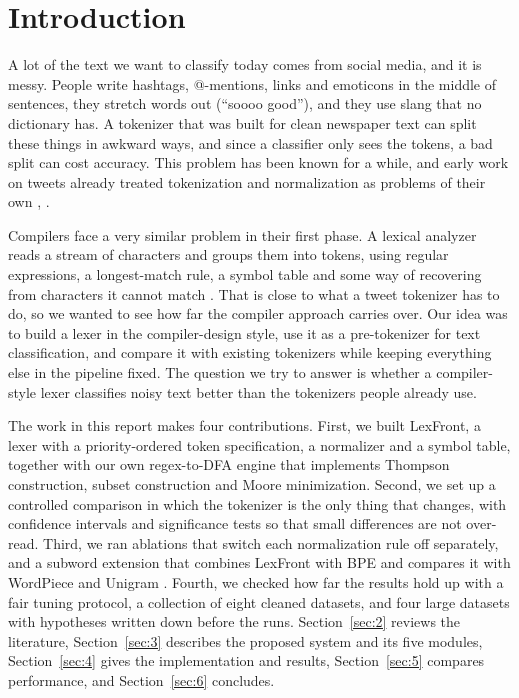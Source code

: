 \documentclass[journal,onecolumn,12pt,a4paper]{IEEEtran}
\begin{document}
\section{Introduction}\label{sec:1}
A lot of the text we want to classify today comes from social media, and it is messy. People write hashtags, @-mentions, links and emoticons in the middle of sentences, they stretch words out (``soooo good''), and they use slang that no dictionary has. A tokenizer that was built for clean newspaper text can split these things in awkward ways, and since a classifier only sees the tokens, a bad split can cost accuracy. This problem has been known for a while, and early work on tweets already treated tokenization and normalization as problems of their own \cite{r2}, \cite{r3}.

Compilers face a very similar problem in their first phase. A lexical analyzer reads a stream of characters and groups them into tokens, using regular expressions, a longest-match rule, a symbol table and some way of recovering from characters it cannot match \cite{r1}. That is close to what a tweet tokenizer has to do, so we wanted to see how far the compiler approach carries over. Our idea was to build a lexer in the compiler-design style, use it as a pre-tokenizer for text classification, and compare it with existing tokenizers while keeping everything else in the pipeline fixed. The question we try to answer is whether a compiler-style lexer classifies noisy text better than the tokenizers people already use.

The work in this report makes four contributions. First, we built LexFront, a lexer with a priority-ordered token specification, a normalizer and a symbol table, together with our own regex-to-DFA engine that implements Thompson construction, subset construction and Moore minimization. Second, we set up a controlled comparison in which the tokenizer is the only thing that changes, with confidence intervals and significance tests so that small differences are not over-read. Third, we ran ablations that switch each normalization rule off separately, and a subword extension that combines LexFront with BPE and compares it with WordPiece and Unigram \cite{r4}. Fourth, we checked how far the results hold up with a fair tuning protocol, a collection of eight cleaned datasets, and four large datasets with hypotheses written down before the runs. Section~\ref{sec:2} reviews the literature, Section~\ref{sec:3} describes the proposed system and its five modules, Section~\ref{sec:4} gives the implementation and results, Section~\ref{sec:5} compares performance, and Section~\ref{sec:6} concludes.
\end{document}
